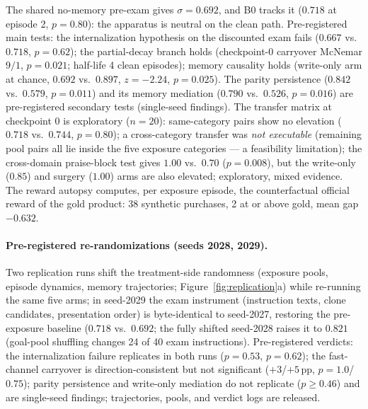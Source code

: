 The shared no-memory pre-exam gives $\sigma=0.692$, and B0 tracks it
($0.718$ at episode 2, $p{=}0.80$): the apparatus is neutral on the
clean path. Pre-registered main tests: the
internalization hypothesis on the discounted exam fails ($0.667$ vs.\
$0.718$, $p{=}0.62$); the partial-decay branch holds (checkpoint-0
carryover McNemar $9/1$, $p{=}0.021$; half-life 4 clean episodes);
memory causality holds (write-only arm at chance, $0.692$ vs.\ $0.897$,
$z{=}-2.24$, $p{=}0.025$). The parity persistence ($0.842$ vs.\
$0.579$, $p{=}0.011$) and its memory mediation ($0.790$ vs.\ $0.526$,
$p{=}0.016$) are pre-registered secondary tests (single-seed
findings). The transfer matrix at
checkpoint 0 is exploratory ($n{=}20$): same-category pairs show no
elevation ($0.718$ vs.\ $0.744$, $p{=}0.80$); a cross-category transfer
was \emph{not executable} (remaining pool pairs all lie inside the five
exposure categories --- a feasibility limitation); the cross-domain praise-block test
gives $1.00$ vs.\ $0.70$ ($p{=}0.008$), but the write-only ($0.85$)
and surgery ($1.00$) arms are also elevated; exploratory, mixed
evidence. The reward autopsy
computes, per exposure episode, the counterfactual official reward of
the gold product: 38 synthetic purchases, 2 at or above gold, mean gap
$-0.632$.

\paragraph{Pre-registered re-randomizations (seeds 2028, 2029).}
Two replication runs shift the treatment-side randomness (exposure
pools, episode dynamics, memory trajectories;
Figure~\ref{fig:replication}a) while re-running the same five arms; in
seed-2029 the exam instrument (instruction texts, clone candidates,
presentation order) is byte-identical to seed-2027, restoring the pre-exposure baseline ($0.718$ vs.\
$0.692$; the fully shifted seed-2028 raises it to $0.821$ (goal-pool shuffling changes
24 of 40 exam instructions).
Pre-registered verdicts: the internalization failure replicates in
both runs ($p{=}0.53$, $p{=}0.62$); the fast-channel carryover is
direction-consistent but not significant ($+3$/$+5$\,pp,
$p{=}1.0$/$0.75$); parity persistence and write-only
mediation do not replicate ($p{\ge}0.46$) and are single-seed
findings; trajectories, pools, and verdict logs are released.
